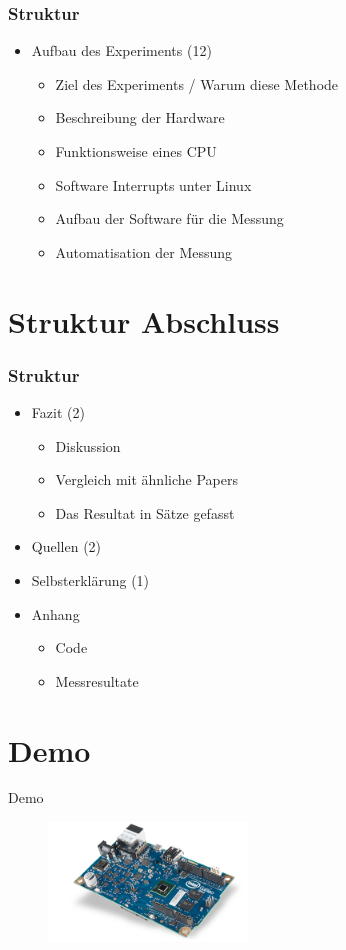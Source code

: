 \documentclass{beamer}
\begin{document}
\begin{frame}
\frametitle{Struktur} 
\begin{itemize}
\item Aufbau des Experiments (12)
 \begin{itemize}
 \item Ziel des Experiments / Warum diese Methode
 \item Beschreibung der Hardware
 \item Funktionsweise eines CPU
 \item Software Interrupts unter Linux
 \item Aufbau der Software für die Messung
 \item Automatisation der Messung 
 \end{itemize}
\end{itemize}
\end{frame}

\section{Struktur Abschluss} 
\begin{frame}
\frametitle{Struktur} 
\begin{itemize}
\item Fazit (2)
\begin{itemize}
  \item Diskussion
  \item Vergleich mit ähnliche Papers
  \item Das Resultat in Sätze gefasst
\end{itemize}
\item Quellen (2)
\item Selbsterklärung (1)
\item Anhang
\begin{itemize}
\item Code
\item Messresultate 
\end{itemize}

\end{itemize}
\end{frame}


\section{Demo} 
\begin{frame}
\Huge Demo

\begin{figure}
  \includegraphics[width=200px,height=120px]{iot_galileo.png}
\end{figure}	

\end{frame}
\end{document}
